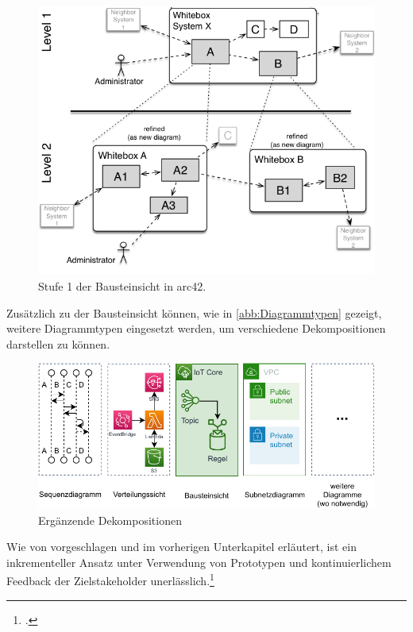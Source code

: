 \begin{figure}[H]
\centering
\includegraphics[height=0.38\textheight]{graphics/Bausteinsicht.png}
\caption[Stufe 1 der Bausteinsicht in arc42]{Stufe 1 der Bausteinsicht in arc42.\footnotemark}
\label{abb:BausteinsichtStufe1}
\end{figure}

Zusätzlich zu der Bausteinsicht können, wie in \autoref{abb:Diagrammtypen} gezeigt, weitere Diagrammtypen eingesetzt werden, um verschiedene Dekompositionen darstellen zu können.

\begin{figure}[H]
\centering
\includegraphics[width=\textwidth]{graphics/Diagrammtypen.pdf}
\caption{Ergänzende Dekompositionen}
\label{abb:Diagrammtypen}
\end{figure}


Wie von \citeauthor{Muller.2020} vorgeschlagen und im vorherigen Unterkapitel erläutert, ist ein inkrementeller Ansatz unter Verwendung von Prototypen und kontinuierlichem Feedback der Zielstakeholder unerlässlich.\footcite[Vgl.][7]{Muller.2020} 

